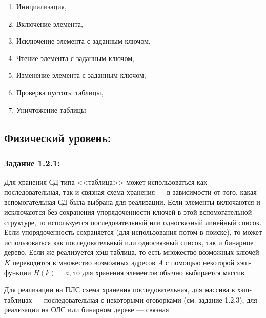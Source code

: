 \documentclass[12pt]{article}
\begin{document}
{	\begin{enumerate}
	\item Инициализация,
	\item Включение элемента,
	\item Исключение элемента с заданным ключом,
	\item Чтение элемента с заданным ключом,
	\item Изменение элемента с заданным ключом,
	\item Проверка пустоты таблицы,
	\item Уничтожение таблицы
	\end{enumerate}
	
	\subsection{Физический уровень:}
	\label{task_1_2}
	\subsubsection{Задание 1.2.1:}
	\label{task_1_2_1}
	Для хранения СД типа <<таблица>> может использоваться как последовательная, так и связная схема хранения --- в зависимости от того, какая вспомогательная СД была выбрана для реализации. Если элементы включаются и исключаются без сохранения упорядоченности ключей в этой вспомогательной структуре, то используется последовательный или односвязный линейный список. Если упорядоченность сохраняется (для использования потом в поиске), то может использоваться как последовательный или односвязный список, так и бинарное дерево. Если же реализуется хэш-таблица, то есть  множество возможных ключей $K$ переводится в множество возможных адресов $A$ с помощью некоторой хэш-функции $H(k) = a$, то для хранения элементов обычно выбирается массив.
	
	Для реализации на ПЛС схема хранения последовательная, для массива в хэш-таблицах --- последовательная с некоторыми оговорками (см. задание 1.2.3), для реализации на ОЛС или бинарном дереве --- связная.
	
}
\end{document}
